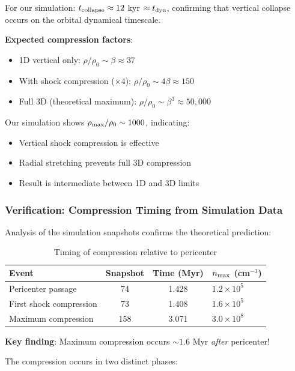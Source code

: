 \documentclass[twocolumn,amsmath,amssymb,prd,superscriptaddress,nofootinbib]{revtex4-2}
\begin{document}
For our simulation: $t_{\rm collapse} \approx 12$ kyr $\approx t_{\rm dyn}$, confirming that vertical collapse occurs on the orbital dynamical timescale.

\textbf{Expected compression factors}:
\begin{itemize}
    \item 1D vertical only: $\rho/\rho_0 \sim \beta \approx 37$
    \item With shock compression ($\times 4$): $\rho/\rho_0 \sim 4\beta \approx 150$
    \item Full 3D (theoretical maximum): $\rho/\rho_0 \sim \beta^3 \approx 50,000$
\end{itemize}

Our simulation shows $\rho_{\rm max}/\rho_0 \sim 1000$, indicating:
\begin{itemize}
    \item Vertical shock compression is effective
    \item Radial stretching prevents full 3D compression
    \item Result is intermediate between 1D and 3D limits
\end{itemize}

\subsubsection{Verification: Compression Timing from Simulation Data}

Analysis of the simulation snapshots confirms the theoretical prediction:

\begin{table}[h]
\centering
\caption{Timing of compression relative to pericenter}
\label{tab:compression_timing}
\begin{tabular}{lccl}
\toprule
Event & Snapshot & Time (Myr) & $n_{\rm max}$ (cm$^{-3}$) \\
\midrule
Pericenter passage & 74 & 1.428 & $1.2 \times 10^5$ \\
First shock compression & 73 & 1.408 & $1.6 \times 10^5$ \\
Maximum compression & 158 & 3.071 & $3.0 \times 10^8$ \\
\bottomrule
\end{tabular}
\end{table}

\textbf{Key finding}: Maximum compression occurs $\sim 1.6$ Myr \textit{after} pericenter!

The compression occurs in two distinct phases:
\end{document}
